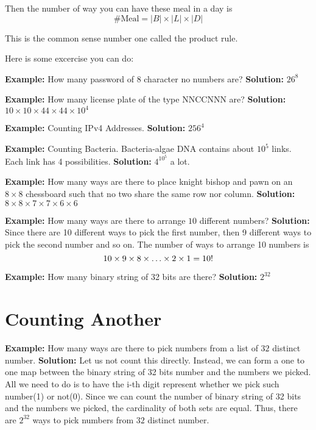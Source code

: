 \documentclass[a4paper, 12pt]{article}
\newcommand{\example}{\vspace{1em}\noindent\textbf{Example:} }
\newcommand{\solution}{\newline\noindent\textbf{Solution:} }
\begin{document}
\begin{multicols}{2}
%	
	
	Then the number of way you can have these meal in a day is
	\[
		\text{\# Meal} = |B|\times |L| \times |D|
	\]
	
	This is the common sense number one called the product rule.
	
	Here is some excercise you can do:
	
	\example How many password of 8 character no numbers are?
	\solution $26^8$
	
	\example How many license plate of the type NNCCNNN are?
	\solution $10\times10 \times 44 \times 44 \times 10^4$
	
	\example Counting IPv4 Addresses.
	\solution $256^4$
	
	\example Counting Bacteria. Bacteria-algae DNA contains about $10^5$ links. Each link has 4 possibilities.
	\solution $4^{10^5}$ a lot.
	
	\example How many ways are there to place knight bishop and pawn on an $8\times 8$ chessboard such that no two share the same row nor column.
	\solution $8 \times 8 \times 7 \times 7 \times 6 \times 6$
	
	\example How many ways are there to arrange $10$ different numbers?
	\solution Since there are 10 different ways to pick the first number, then 9 different ways to pick the second number and so on. The number of ways to arrange 10 numbers is
	\[
		10\times 9 \times 8 \times \ldots \time 3 \times 2 \times 1 = 10!
	\]
	
	\example How many binary string of 32 bits are there?
	\solution $2^{32}$
	
	\section*{Counting Another}
	\example How many ways are there to pick numbers from a list of $32$ distinct number.
	\solution Let us not count this directly. Instead, we can form a one to one map between the binary string of 32 bits number and the numbers we picked. All we need to do is to have the i-th digit represent whether we pick such number(1) or not(0).  Since we can count the number of binary string of 32 bits and the numbers we picked, the cardinality of both sets are equal. Thus, there are $2^{32}$ ways to pick numbers from $32$ distinct number.
	

\end{multicols}
\end{document}
